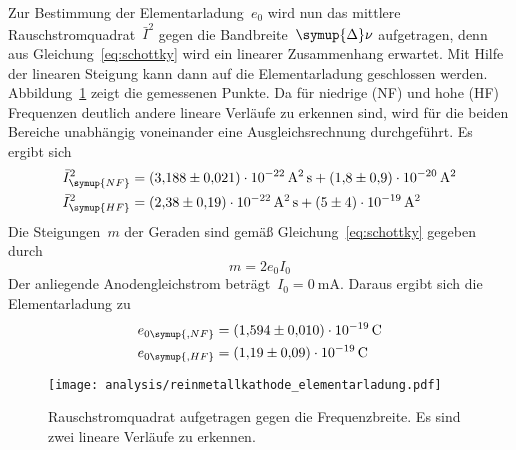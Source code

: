 Zur Bestimmung der Elementarladung~$e_0$ wird nun das mittlere
Rauschstromquadrat~$\bar{I}^2$ gegen die Bandbreite~$\symup{\Delta}\nu$
aufgetragen, denn aus Gleichung~\eqref{eq:schottky} wird ein linearer
Zusammenhang erwartet. Mit Hilfe der linearen Steigung kann dann auf die
Elementarladung geschlossen werden.
Abbildung~\ref{fig:reinmetallkathode_elementarladung} zeigt die gemessenen
Punkte. Da für niedrige (NF) und hohe (HF) Frequenzen deutlich andere lineare
Verläufe zu erkennen sind, wird für die beiden Bereiche unabhängig voneinander
eine Ausgleichsrechnung durchgeführt. Es ergibt sich
%
\begin{align}
    \bar{I}^2_{\symup{NF}}&=\SI{3.188(21)e-22}{\ampere\squared\second}+\SI{1.8(9)e-20}{\ampere\squared} \\
    \bar{I}^2_{\symup{HF}}&=\SI{2.38(19)e-22}{\ampere\squared\second}+\SI{5(4)e-19}{\ampere\squared}
\end{align}
%
Die Steigungen~$m$ der Geraden sind gemäß Gleichung~\eqref{eq:schottky} gegeben
durch
%
\begin{equation}
  m=2e_0I_0
\end{equation}
%
Der anliegende Anodengleichstrom beträgt~$I_0=\SI{0}{\milli\ampere}$. Daraus
ergibt sich die Elementarladung zu
%
\begin{align}
  e_{0\symup{, NF}}&=\SI{1.594(10)e-19}{\coulomb} \\
  e_{0\symup{, HF}}&=\SI{1.19(9)e-19}{\coulomb}
\end{align}

\begin{figure}[htb]
  \centering
  \texttt{[image: analysis/reinmetallkathode\_elementarladung.pdf]}
  \caption{Rauschstromquadrat aufgetragen gegen die Frequenzbreite. Es sind zwei
  lineare Verläufe zu erkennen.}
  \label{fig:reinmetallkathode_elementarladung}
\end{figure}
